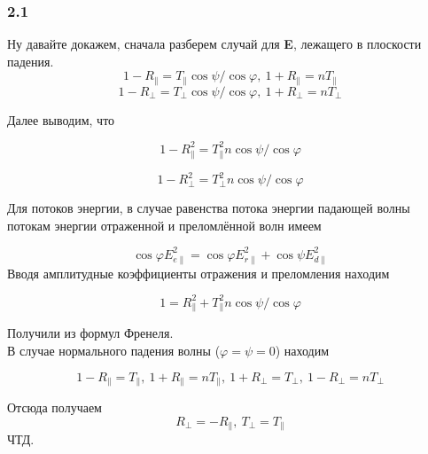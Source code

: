 \subsubsection*{2.1}
Ну давайте докажем, сначала разберем случай для \textbf{E}, лежащего в плоскости падения.
\begin{equation*}
	1 - R_{\|} = T_{\|} \cos{\psi} / \cos{\varphi}, \  1 + R_{\|} = nT_{\|}
\end{equation*}
\begin{equation*}
	1 - R_{\bot} = T_{\bot} \cos{\psi} / \cos{\varphi}, \  1 + R_{\bot} = nT_{\bot}
\end{equation*}

Далее выводим, что

\begin{equation*}
	1 - R_{\|}^2 = T_{\|}^2 n\cos{\psi} / \cos{\varphi} 
\end{equation*}

\begin{equation*}
	1 - R_{\bot}^2 = T_{\bot}^2 n\cos{\psi} / \cos{\varphi} 
\end{equation*}

Для потоков энергии, в случае равенства потока энергии падающей волны потокам энергии отраженной и преломлённой волн имеем

\begin{equation*}
	\cos{\varphi} E_{e\|}^2 = \cos{\varphi} E_{r\|}^2  + \cos{\psi} E_{d\|}^2 
\end{equation*}
Вводя амплитудные коэффициенты отражения и преломления находим

\begin{equation*}
	1 = R_{\|}^2 + T_{\|}^2 n\cos{\psi} / \cos{\varphi} 
\end{equation*}

Получили из формул Френеля.\\
В случае нормального падения волны ($\varphi = \psi = 0$) находим

\begin{equation*}
	1 - R_{\|} = T_{\|}, \ 1 + R_{\|} = nT_{\|}, \ 1 + R_{\bot} = T_{\bot}, \ 1 - R_{\bot} = nT_{\bot}
\end{equation*}

Отсюда получаем 
\begin{equation*}
	R_{\bot} = -R_{\|}, \  T_{\bot} = T_{\|}
\end{equation*}
ЧТД.